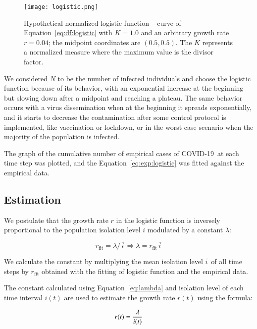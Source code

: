 \documentclass[review]{elsarticle}
\def\covid{\hbox{COVID-19}} %
\def\eq#1{Equation~#1}
\begin{document}
\begin{figure}
\centering
\texttt{[image: logistic.png]}
\caption{Hypothetical normalized logistic function -- 
curve of \eq{\ref{eq:df:logistic}} with 
$K=1.0$ and an arbitrary growth rate $r=0.04$; 
the midpoint coordinates are $(0.5, 0.5)$.
The $K$ represents a normalized measure where 
the maximum value is the divisor factor.}
\label{fig:logistic}
\end{figure}

We considered $N$ to be the number of infected individuals 
and choose the logistic function because of its behavior, 
with an exponential increase at the beginning but slowing down after 
a  midpoint and reaching a plateau. 
The same behavior occurs with a virus dissemination when at the 
beginning it spreads exponentially, and it starts to 
decrease the contamination after some control protocol is implemented, 
like vaccination or lockdown, 
or in the worst case scenario when the majority of the population is infected.

The graph of the cumulative number of empirical cases of \covid\ 
at each time step was plotted, 
and the \eq{\ref{eq:exp:logistic}} was fitted against the 
empirical data.

\subsection{Estimation}

We postulate that the growth rate $r$ in the logistic function is 
inversely proportional to the population isolation level $i$ 
modulated by a constant $\lambda$:

\begin{equation}
r_{\text{fit}} = {\lambda /\, \overline{i\,}} \Rightarrow \lambda = r_{\text{fit}}\, \overline{i\,}
\label{eq:lambda}
\end{equation}

We calculate the constant by multiplying 
the mean isolation level $\overline{i\,}$  
of all time steps by 
$r_{\text{fit}}$ obtained with the fitting of 
logistic function and the empirical data.

The constant calculated using \eq{\ref{eq:lambda}}
and isolation level of each time interval $i(t)$ 
are used to estimate the growth rate $r(t)$ using the formula:

\begin{equation}
r(t) = {\lambda\over i(t)}
\label{eq:rt}
\end{equation}
\end{document}
